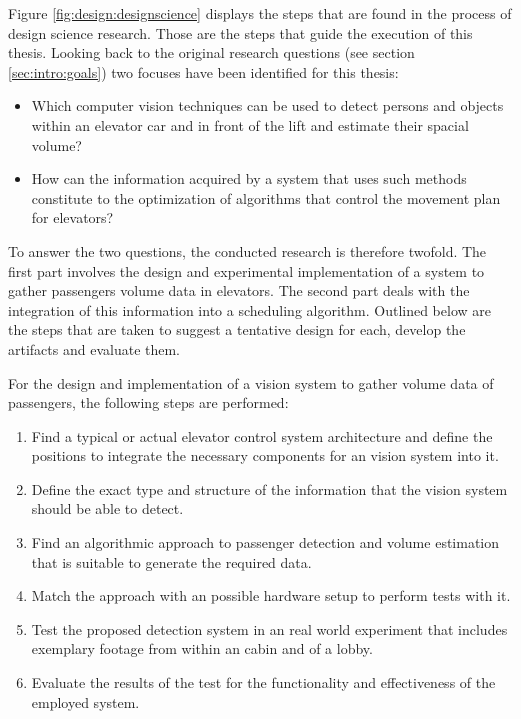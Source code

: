 Figure \ref{fig:design:designscience} displays the steps that are found in the process of design science research. 
Those are the steps that guide the execution of this thesis.
Looking back to the original research questions (see section \vref{sec:intro:goals}) two focuses have been identified for this thesis:

\begin{itemize}
    \item Which computer vision techniques can be used to detect persons and objects within an elevator car and in front of the lift and estimate their spacial volume?
    \item How can the information acquired by a system that uses such methods constitute to the optimization of algorithms that control the movement plan for elevators?
\end{itemize}



To answer the two questions, the conducted research is therefore twofold.
The first part involves the design and experimental implementation of a system to gather passengers volume data in elevators.
The second part deals with the integration of this information into a scheduling algorithm.
Outlined below are the steps that are taken to
suggest a tentative design for each, develop the artifacts and evaluate them.

For the  design and implementation of a vision system to gather volume data of passengers,
the following steps are performed:

\begin{enumerate}
    \item Find a typical or actual elevator control system architecture and define the positions to integrate the necessary components for an vision system into it.
    \item Define the exact type and structure of the information that the vision system should be able to detect.
    \item Find an algorithmic approach to  passenger detection and volume estimation that is suitable to generate the required data.
    \item Match the approach with an possible hardware setup to perform tests with it.
    \item Test the proposed detection system in an real world experiment that includes  exemplary footage from within an cabin and of a lobby.
    \item Evaluate the results of the test for the functionality and effectiveness of the employed system.
\end{enumerate}


